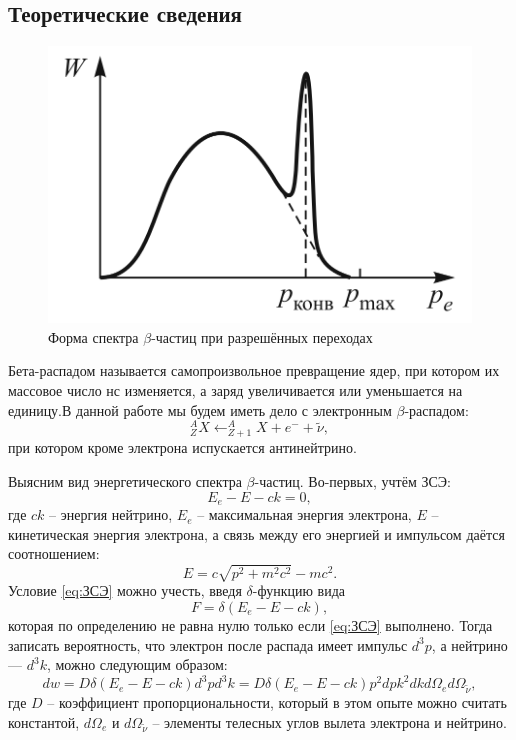 \documentclass[a4paper, 12pt]{article}%
\newcommand{\btt}{$\beta $}
\newcommand{\dlt}{$\delta $}
\begin{document}
	\subsection{Теоретические сведения}
	
	\begin{figure}
		\includegraphics[width=1.0\linewidth]{Screenshot_1}
		\caption{Форма спектра \btt-частиц при разрешённых переходах}
		\label{fig:screenshot1}
	\end{figure}
	
	Бета-распадом называется самопроизвольное превращение ядер,	при котором их массовое число нс изменяется, а заряд увеличивается или уменьшается на единицу.В данной работе мы будем иметь дело с электронным \btt-распадом:
	\begin{equation*}
		^A_Z X \leftarrow ^A_{Z+1} X+e^-+\widetilde{\nu},
	\end{equation*}
	при котором кроме электрона испускается антинейтрино. 
	
	Выясним вид энергетического спектра \btt-частиц.
	Во-первых, учтём ЗСЭ:
	\begin{equation}\label{eq:ЗСЭ}
		E_e - E - c k = 0,
	\end{equation}
	где $ c k $ -- энергия нейтрино, $ E_e $ -- максимальная энергия электрона, $ E $ -- кинетическая энергия электрона, а связь между его энергией и импульсом даётся соотношением:
	\begin{equation}\label{eq:E}
		E = c \sqrt{p^2+m^2 c^2} - m c^2.
	\end{equation}
	Условие \eqref{eq:ЗСЭ} можно учесть, введя \dlt-функцию вида
	\begin{equation*}\label{key}
		F = \delta(E_e - E - c k),
	\end{equation*}
	которая по определению не равна нулю только если \eqref{eq:ЗСЭ} выполнено.
	Тогда записать вероятность, что электрон после распада имеет импульс $ d^3 p $, а нейтрино --- $ d^3 k $, можно следующим образом:
	\begin{equation}\label{eq:вероятн}
		d w = D \delta(E_e - E - c k) d^3 p d^3 k = D \delta(E_e - E - c k) p^2 d p k^2 d k d \Omega_e d \Omega_{\widetilde{\nu}},
	\end{equation}
	где $ D $ -- коэффициент пропорциональности, который в этом опыте можно считать константой, $ d \Omega_e $ и $ d \Omega_{\widetilde{\nu}} $ -- элементы телесных углов вылета электрона и нейтрино.
	
\end{document}
